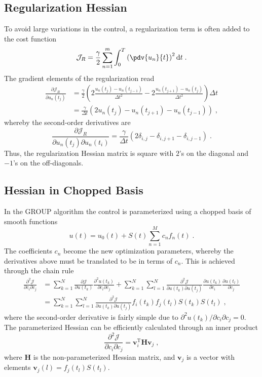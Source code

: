 \subsection*{Regularization Hessian}
To avoid large variations in the control, a regularization term is often added to the cost function
\begin{equation}
	\mathcal{J}_R =\frac{\gamma}{2} \sum_{n=1}^{m} \int_{0}^{T} \left( \pdv{u_n}{t} \right)^2 \mathrm{d}t \; .
\end{equation} 
The gradient elements of the regularization read
\begin{align}
	\frac{\partial \mathcal{J}_R}{\partial u_n (t_j)} &= \frac{\gamma}{2} \left( 2 \frac{u_n (t_j) - u_n (t_{j-1})}{\Delta t^2} - 2 \frac{u_n (t_{j+1}) - u_n (t_j)}{\Delta t^2} \right) \Delta t \nonumber \\
	&= \frac{\gamma}{\Delta t} \left( 2 u_n (t_j) - u_n (t_{j+1}) - u_n (t_{j-1}) \right) \; ,
\end{align}
whereby the second-order derivatives are
\begin{equation}
	\frac{\partial \mathcal{J}_R}{\partial u_n (t_j) \partial u_n (t_i)} = \frac{\gamma}{\Delta t} \left( 2 \delta_{i,j} - \delta_{i,j+1} - \delta_{i,j-1} \right) \; .
\end{equation}
Thus, the regularization Hessian matrix is square with $2$'s on the diagonal and $-1$'s on the off-diagonals.


\subsection*{Hessian in Chopped Basis}
In the GROUP algorithm the control is parameterized using a chopped basis of smooth functions
\begin{equation}
	u(t) = u_0 (t) + S(t) \sum_{n=1}^{M} c_n f_n (t) \; .
\end{equation}    
The coefficients $c_n$ become the new optimization parameters, whereby the derivatives above must be translated to be in terms of $c_n$. This is achieved through the chain rule
\begin{align}
	\frac{\partial^2 \mathcal{J}}{\partial c_i \partial c_j} &= \sum_{k = 1}^{N} \frac{\partial \mathcal{J}}{\partial u (t_k)} \frac{\partial ^2 u (t_k)}{\partial c_i \partial c_j} + \sum_{k = 1}^{N} \sum_{l = 1}^{N} \frac{\partial^2 \mathcal{J}}{\partial u (t_k) \partial u (t_j)} \frac{\partial u (t_k)}{\partial c_i} \frac{\partial u (t_l)}{\partial c_j} \nonumber \\
	&= \sum_{k = 1}^{N} \sum_{l = 1}^{N} \frac{\partial^2 \mathcal{J}}{\partial u (t_k) \partial u (t_j)} f_i (t_k) f_j (t_l) S(t_k) S(t_l) \; ,
\end{align}
where the second-order derivative is fairly simple due to ${\partial ^2 u (t_k)}/{\partial c_i \partial c_j} = 0$.
The parameterized Hessian can be efficiently calculated through an inner product
\begin{equation}
	\frac{\partial^2 \mathcal{J}}{\partial c_i \partial c_j} = \boldsymbol{v}_{i}^{\mathrm{T}} \boldsymbol{H} \boldsymbol{v}_j \; ,
\end{equation}
where $\boldsymbol{H}$ is the non-parameterized Hessian matrix, and $\boldsymbol{v}_j$ is a vector with elements $\boldsymbol{v}_j (l) = f_j (t_l) S(t_l)$.